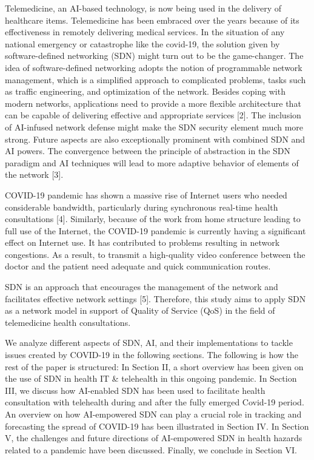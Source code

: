 \documentclass[10pt]{article}
\begin{document}
Telemedicine, an AI-based technology, is now being used in the delivery of healthcare items. Telemedicine has been embraced over the years because of its effectiveness in remotely delivering medical services. In the situation of any national emergency or catastrophe like the covid-19, the solution given by software-defined networking (SDN) might turn out to be the game-changer. The idea of software-defined networking adopts the notion of programmable network management, which is a simplified approach to complicated problems, tasks such as traffic engineering, and optimization of the network. Besides coping with modern networks, applications need to provide a more flexible architecture that can be capable of delivering effective and appropriate services [2]. The inclusion of AI-infused network defense might make the SDN security element much more strong. Future aspects are also exceptionally prominent with combined SDN and AI powers. The convergence between the principle of abstraction in the SDN paradigm and AI techniques will lead to more adaptive behavior of elements of the network [3].

COVID-19 pandemic has shown a massive rise of Internet users who needed considerable bandwidth, particularly during synchronous real-time health consultations [4]. Similarly, because of the work from home structure leading to full use of the Internet, the COVID-19 pandemic is currently having a significant effect on Internet use. It has contributed to problems resulting in network congestions. As a result, to transmit a high-quality video conference between the doctor and the patient need adequate and quick communication routes.

SDN is an approach that encourages the management of the network and facilitates effective network settings [5]. Therefore, this study aims to apply SDN as a network model in support of Quality of Service (QoS) in the field of telemedicine health consultations.

We analyze different aspects of SDN, AI, and their implementations to tackle issues created by COVID-19 in the following sections. The following is how the rest of the paper is structured: In Section II, a short overview has been given on the use of SDN in health IT \& telehealth in this ongoing pandemic. In Section III, we discuss how AI-enabled SDN has been used to facilitate health consultation with telehealth during and after the fully emerged Covid-19 period. An overview on how AI-empowered SDN can play a crucial role in tracking and forecasting the spread of COVID-19 has been illustrated in Section IV. In Section V, the challenges and future directions of AI-empowered SDN in health hazards related to a pandemic have been discussed. Finally, we conclude in Section VI.
\end{document}
